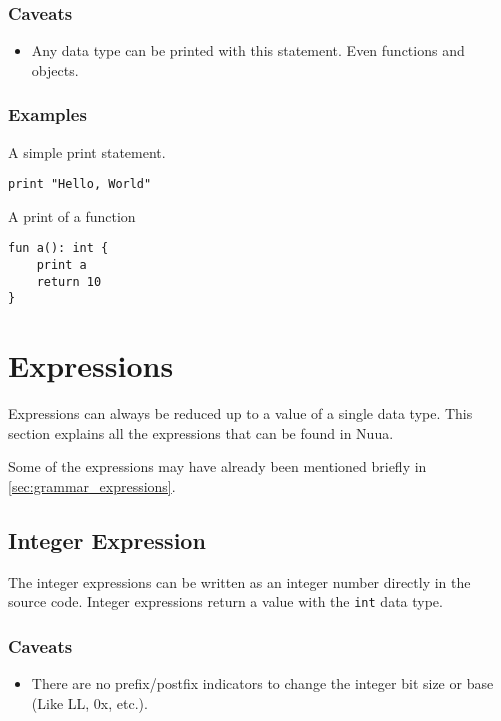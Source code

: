 \subsubsection{Caveats}

\begin{itemize}
    \item Any data type can be printed with this statement. Even functions and objects.
\end{itemize}

\subsubsection{Examples}

A simple print statement.
\begin{lstlisting}
print "Hello, World"
\end{lstlisting}
A print of a function
\begin{lstlisting}
fun a(): int {
    print a
    return 10
}
\end{lstlisting}

\section{Expressions}
\label{sec:expressions}

Expressions can always be reduced up to a value of a single data type. This section explains all the expressions that can be found
in Nuua.

Some of the expressions may have already been mentioned briefly in \autoref{sec:grammar_expressions}.

\subsection{Integer Expression}

The integer expressions can be written as an integer number directly in the source code.
Integer expressions return a value with the \texttt{int} data type.

\subsubsection{Caveats}

\begin{itemize}
    \item There are no prefix/postfix indicators to change the integer bit size or base (Like LL, 0x, etc.).
\end{itemize}

